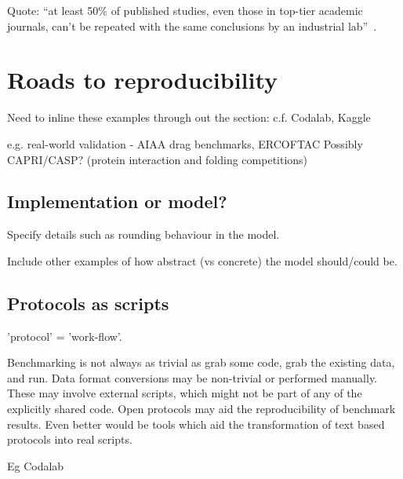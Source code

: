\documentclass[conference]{IEEEtran}
\begin{document}
Quote: ``at least 50\% of published studies, even those in top-tier
academic journals, can't be repeated with the same conclusions by an
industrial lab''~\cite{osherovich:2011}.



\section{Roads to reproducibility}


Need to inline these examples through out the section: 
	c.f. Codalab, Kaggle

	e.g. real-world validation - AIAA drag benchmarks, ERCOFTAC
	Possibly CAPRI/CASP? (protein interaction and folding competitions)


\subsection{Implementation or model?}

Specify details such as rounding behaviour in the model.

Include other examples of how abstract (vs concrete) the model should/could be. 




\subsection{Protocols as scripts}

'protocol' = 'work-flow'. 

Benchmarking is not always as trivial as grab some code, grab the 
existing data, and run. Data format conversions may be non-trivial
or performed manually. These may involve external scripts, which 
might not be part of any of the explicitly shared code. Open 
protocols may aid the reproducibility of benchmark results. Even 
better would be tools which aid the transformation of text based
protocols into real scripts.

Eg Codalab
\end{document}
